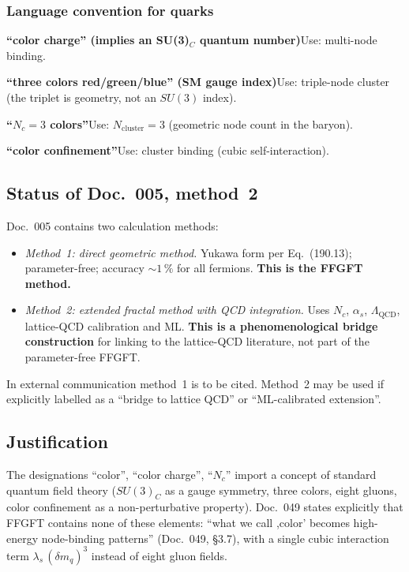 \subsubsection*{Language convention for quarks}

\smallskip\noindent \textbf{\enquote{color charge} (implies an SU(3)$_C$ quantum number)}\quad Use: multi-node binding.

\smallskip\noindent \textbf{\enquote{three colors red/green/blue} (SM gauge index)}\quad Use: triple-node cluster (the triplet is geometry, not an $SU(3)$ index).

\smallskip\noindent \textbf{\enquote{$N_c = 3$ colors}}\quad Use: $N_{\text{cluster}} = 3$ (geometric node count in the baryon).

\smallskip\noindent \textbf{\enquote{color confinement}}\quad Use: cluster binding (cubic self-interaction).

\medskip


\subsection*{Status of Doc.~005, method~2}

Doc.~005 contains two calculation methods:
\begin{itemize}
  \item \emph{Method~1: direct geometric method.} Yukawa form per
        Eq.~(190.13); parameter-free; accuracy $\sim 1\,\%$ for all fermions.
        \textbf{This is the FFGFT method.}
  \item \emph{Method~2: extended fractal method with QCD integration.} Uses
        $N_c$, $\alpha_s$, $\Lambda_{\text{QCD}}$, lattice-QCD calibration and
        ML. \textbf{This is a phenomenological bridge construction} for linking
        to the lattice-QCD literature, not part of the parameter-free FFGFT.
\end{itemize}

In external communication method~1 is to be cited. Method~2 may be used if
explicitly labelled as a \enquote{bridge to lattice QCD} or
\enquote{ML-calibrated extension}.

\subsection*{Justification}

The designations \enquote{color}, \enquote{color charge}, \enquote{$N_c$}
import a concept of standard quantum field theory ($SU(3)_C$ as a gauge
symmetry, three colors, eight gluons, color confinement as a non-perturbative
property). Doc.~049 states explicitly that FFGFT contains none of these
elements: \enquote{what we call ,color' becomes high-energy node-binding
patterns} (Doc.~049, §3.7), with a single cubic interaction term
$\lambda_s\,(\delta m_q)^3$ instead of eight gluon fields.


